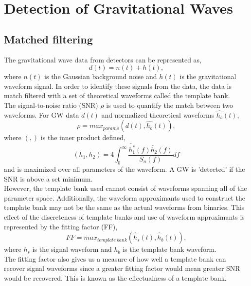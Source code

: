 \documentclass{article}
\begin{document}
\section{Detection of Gravitational Waves}
\subsection{Matched filtering}
The gravitational wave data from detectors can be represented as,
\begin{equation}
    d(t) = n(t) + h(t) ,\label{GWData}
\end{equation}
where $n(t)$ is the Gaussian background noise and $h(t)$ is the gravitational waveform signal. In order to identify these signals from the data, the data is match filtered with a set of theoretical waveforms called the template bank. \\
The signal-to-noise ratio (SNR) $\rho$ is used to quantify the match between two waveforms. For GW data $d(t)$ and normalized theoretical waveforms $\hat{h_b}(t)$,
\begin{equation}
    \rho = max_{params} \left( d(t), \hat{h_b}(t)\right), \label{SNR}
\end{equation}
where $(,)$ is the inner product defined,
\begin{equation}
    (h_1, h_2) = 4 \int_{0}^{\infty} \frac{\tilde{h_1^*}(f)\tilde{h_2}(f)}{S_n(f)}df
\end{equation}
and is maximized over all parameters of the waveform. A GW is 'detected' if the SNR is above a set minimum. \\
However, the template bank used cannot consist of waveforms spanning all of the parameter space. Additionally, the waveform approximants used to construct the template bank may not be the same as the actual waveforms from binaries. This effect of the discreteness of template banks and use of waveform approximants is represented by the fitting factor (FF),
\begin{equation}
    FF = max_{template \; bank}\left ( \hat{h}_s(t), \hat{h}_b(t)\right ),
\end{equation}
where $h_s$ is the signal waveform and $h_b$ is the template bank waveform.\\
The fitting factor also gives us a measure of how well a template bank can recover signal waveforms since a greater fitting factor would mean greater SNR would be recovered. This is known as the effectualness of a template bank.  
\end{document}
